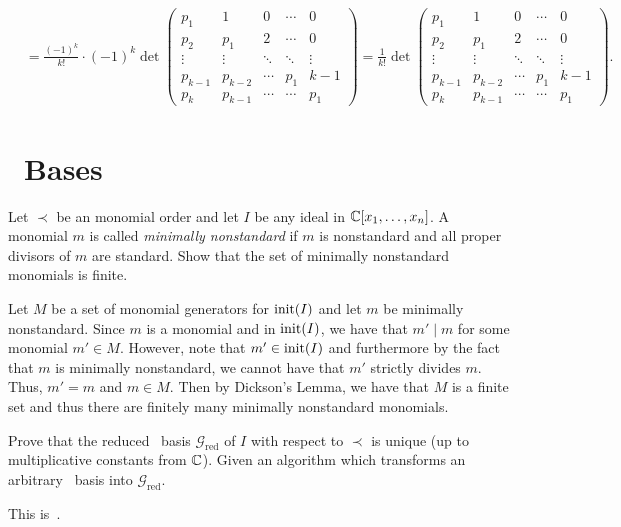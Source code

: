 \documentclass[letterpaper, 11pt, oneside]{book}
\begin{document}
\begin{sol}
\begin{align*}
    &= \frac{(-1)^{k}}{k!} \cdot (-1)^{k}
  \det
  \begin{pmatrix}
    p_{1} & 1 & 0 & \cdots & 0 \\
    p_{2} & p_{1} & 2 & \cdots & 0 \\
    \vdots & \vdots & \ddots & \ddots & \vdots \\
    p_{k - 1} & p_{k - 2} & \cdots & p_{1} & k - 1 \\
    p_{k} & p_{k - 1} & \cdots & \cdots & p_{1}
  \end{pmatrix}
     = \frac{1}{k!}
  \det
  \begin{pmatrix}
    p_{1} & 1 & 0 & \cdots & 0 \\
    p_{2} & p_{1} & 2 & \cdots & 0 \\
    \vdots & \vdots & \ddots & \ddots & \vdots \\
    p_{k - 1} & p_{k - 2} & \cdots & p_{1} & k - 1 \\
    p_{k} & p_{k - 1} & \cdots & \cdots & p_{1}
  \end{pmatrix}.
\end{align*}
\end{sol}

\section*{\Grobner\ Bases}

\begin{exercise}
  Let $\prec$ be an monomial order and let $I$ be any ideal in $\mathbb{C}[x_{1}, \ldots, x_{n}]$.
  A monomial $m$ is called \emph{minimally nonstandard} if $m$ is nonstandard and all proper divisors of $m$ are standard.
  Show that the set of minimally nonstandard monomials is finite.
\end{exercise}
\begin{sol}
  Let $M$ be a set of monomial generators for $\operatorname{init}(I)$ and let $m$ be minimally nonstandard.
  Since $m$ is a monomial and in $\operatorname{init}(I)$, we have that $m' \mid m$ for some monomial $m' \in M$.
  However, note that $m' \in \operatorname{init}(I)$ and furthermore by the fact that $m$ is minimally nonstandard, we cannot have that $m'$ strictly divides $m$.
  Thus, $m' = m$ and $m \in M$.
  Then by Dickson's Lemma, we have that $M$ is a finite set and thus there are finitely many minimally nonstandard monomials.
\end{sol}

\begin{exercise}
  Prove that the reduced \Grobner\ basis $\mathcal{G}_{\text{red}}$ of $I$ with respect to $\prec$ is unique (up to multiplicative constants from $\mathbb{C}$).
  Given an algorithm which transforms an arbitrary \Grobner\ basis into $\mathcal{G}_{\text{red}}$.
\end{exercise}
\begin{sol}
  This is~\cite[Chapter 2, \S 7, Theorem 5]{book:IVA}.
\end{sol}
\end{document}

